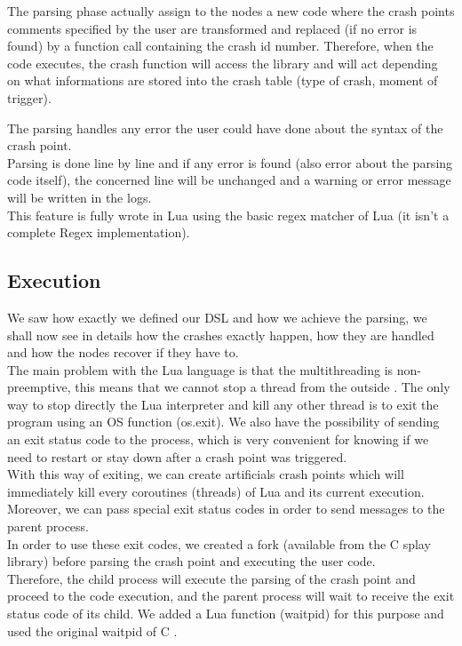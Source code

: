 \documentclass{eplmastersthesis}
\begin{document}
          The parsing phase actually assign to the nodes a new code where the
          crash points comments specified by the user are transformed and
          replaced (if no error is found) by a function call containing the
          crash id number. Therefore, when the code executes, the crash
          function will access the library and will act depending on what
          informations are stored into the crash table (type of crash,
          moment of trigger).

          The parsing handles any error the user could have done about the
          syntax of the crash point.\\
          Parsing is done line by line and if any error is found (also error
          about the parsing code itself), the concerned line will be unchanged and
          a warning or error message will be written in the logs.\\
          This feature is fully wrote in Lua using the basic regex matcher of Lua
          \cite{RegexLua} (it isn't a complete Regex implementation).

        \subsection{Execution}

          We saw how exactly we defined our DSL and how we achieve the parsing,
          we shall now see in details how the crashes exactly happen, how they
          are handled and how the nodes recover if they have to.\\

          The main problem with the Lua language is that the multithreading
          is non-preemptive, this means that we cannot stop a thread from the
          outside \cite{CoroutineLua}. The only way to stop directly the Lua
          interpreter and kill any other thread is to exit the program using
          an OS function (os.exit). We also have the possibility of sending an exit
          status code to the process, which is very convenient for knowing
          if we need to restart or stay down after a crash point was
          triggered.\\

          With this way of exiting, we can create artificials crash points which
          will immediately kill every coroutines (threads) of Lua and its
          current execution. Moreover, we can pass special exit status codes
          in order to send messages to the parent process.\\
          In order to use these exit codes, we created a fork (available from
          the C splay library) before parsing the crash point and executing
          the user code.\\
          Therefore, the child process will execute the parsing of the crash
          point and proceed to the code execution, and the parent process will
          wait to receive the exit status code of its child. We added a Lua
          function (waitpid) for this purpose and used the original waitpid
          of C \cite{waitpid}.\\
\end{document}
